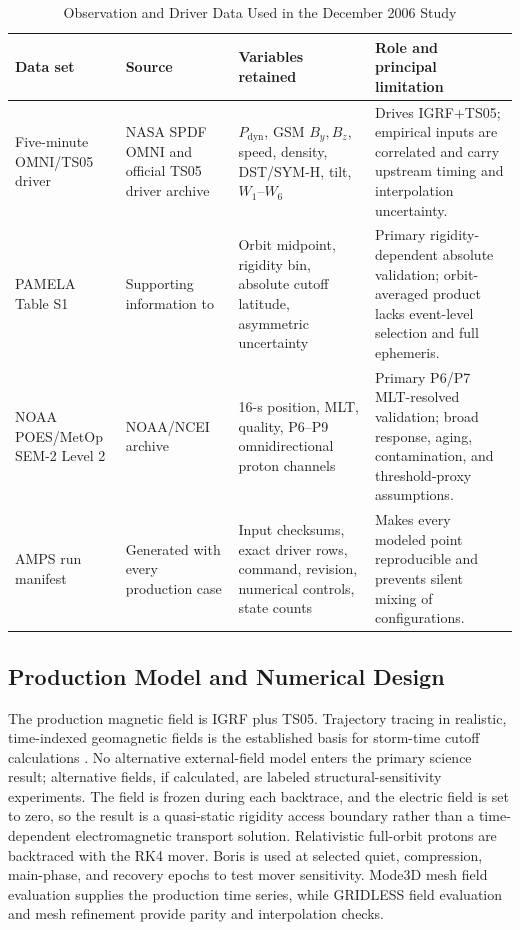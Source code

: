 \begin{table}
\caption{Observation and Driver Data Used in the December 2006 Study}
\label{tab:exp-data}
\centering
\small
\begin{tabular}{p{}p{}p{}p{}}
\toprule
Data set & Source & Variables retained & Role and principal limitation \\
\midrule
Five-minute OMNI/TS05 driver & NASA SPDF OMNI and official TS05 driver archive & $P_{\mathrm{dyn}}$, GSM $B_y,B_z$, speed, density, DST/SYM-H, tilt, $W_1$--$W_6$ & Drives IGRF+TS05; empirical inputs are correlated and carry upstream timing and interpolation uncertainty. \\
PAMELA Table S1 & Supporting information to \citet{Adriani-2016-SW} & Orbit midpoint, rigidity bin, absolute cutoff latitude, asymmetric uncertainty & Primary rigidity-dependent absolute validation; orbit-averaged product lacks event-level selection and full ephemeris. \\
NOAA POES/MetOp SEM-2 Level 2 & NOAA/NCEI archive & 16-s position, MLT, quality, P6--P9 omnidirectional proton channels & Primary P6/P7 MLT-resolved validation; broad response, aging, contamination, and threshold-proxy assumptions. \\
AMPS run manifest & Generated with every production case & Input checksums, exact driver rows, command, revision, numerical controls, state counts & Makes every modeled point reproducible and prevents silent mixing of configurations. \\
\bottomrule
\end{tabular}
\end{table}

\subsection{Production Model and Numerical Design}

The production magnetic field is IGRF plus TS05. Trajectory tracing in
realistic, time-indexed geomagnetic fields is the established basis for
storm-time cutoff calculations \cite{Cooke-1991-INC,Smart-2005-ASR,
Kress-2010-SW,Kress-2015-JGR}. No alternative external-field
model enters the primary science result; alternative fields, if calculated,
are labeled structural-sensitivity experiments. The field is frozen during
each backtrace, and the electric field is set to zero, so the result is a
quasi-static rigidity access boundary rather than a time-dependent
electromagnetic transport solution. Relativistic full-orbit protons are
backtraced with the RK4 mover. Boris is used at selected quiet, compression,
main-phase, and recovery epochs to test mover sensitivity. Mode3D mesh field
evaluation supplies the production time series, while GRIDLESS field
evaluation and mesh refinement provide parity and interpolation checks.

